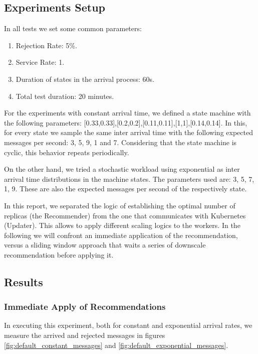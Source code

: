\subsection{Experiments Setup}
In all tests we set some common parameters:
\begin{enumerate}
    \item Rejection Rate: 5\%.
    \item Service Rate: 1.
    \item Duration of states in the arrival process: 60s.
    \item Total test duration: 20 minutes.
\end{enumerate}

For the experiments with constant arrival time, we defined a state machine with the following parameters: [0.33,0.33],[0.2,0.2],[0.11,0.11],[1,1],[0.14,0.14]. In this, for every state we sample the same inter arrival time with the following expected messages per second: 3, 5, 9, 1 and 7. Considering that the state machine is cyclic, this behavior repeats periodically.

On the other hand, we tried a stochastic workload using exponential as inter arrival time distributions in the machine states. The parameters used are: 3, 5, 7, 1, 9. These are also the expected messages per second of the respectively state.

In this report, we separated the logic of establishing the optimal number of replicas (the Recommender) from the one that communicates with Kubernetes (Updater). This allows to apply different scaling logics to the workers. In the following we will confront an immediate application of the recommendation, versus a sliding window approach that waits a series of downscale recommendation before applying it.

\subsection{Results}
\subsubsection{Immediate Apply of Recommendations}

In executing this experiment, both for constant and exponential arrival rates, we measure the arrived and rejected messages in figures \ref{fig:default_constant_messages} and \ref{fig:default_exponential_messages}.

